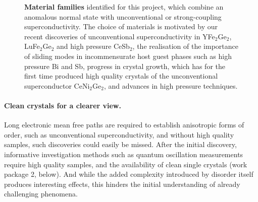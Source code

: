 \begin{figure}[t]
   \caption{{\bf Material families} identified for this project, which combine an anomalous normal state %
   with unconventional or strong-coupling superconductivity. The choice of materials is motivated by our recent discoveries of unconventional superconductivity in YFe$_2$Ge$_2$, LuFe$_2$Ge$_2$ and high pressure CeSb$_2$, the realisation of the importance of sliding modes in incommensurate host guest phases such as high pressure Bi \protect{} and Sb,  progress in crystal growth, which has for the first time  produced high quality crystals of the unconventional superconductor CeNi$_2$Ge$_2$, and advances in high pressure techniques. }%
    \label{fig:Materials}
\end{figure}

\paragraph{Clean crystals for a clearer view.} Long electronic mean free paths are required to establish anisotropic forms of order, such as unconventional superconductivity, and without high quality samples, such discoveries could easily be missed. After the initial discovery, informative investigation methods such as quantum oscillation measurements require high quality samples, and the availability of clean single crystals  (work package 2, below). And while the added complexity introduced by disorder itself produces interesting effects, this hinders the initial understanding of already challenging phenomena. %



